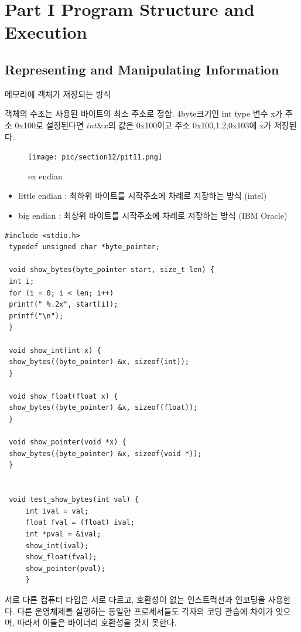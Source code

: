 \documentclass[chapter,oneside]{oblivoir}
\begin{document}
\part{Part I Program Structure and Execution}

\chapter{Representing and Manipulating Information}


메모리에 객체가 저장되는 방식

객체의 수조는 사용된 바이트의 최소 주소로 정함.
4byte크기인 int type 변수 x가 주소 0x100로 설정된다면 $int \&x$의 값은 0x100이고 주소 0x100,1,2,0x103에 x가 저장된다.






\begin{figure}[h!]
    \centering
    \texttt{[image: pic/section12/pit11.png]}
    \caption{ex endian}
\end{figure}


\begin{itemize}
    \item little endian :  최하위 바이트를 시작주소에 차례로 저장하는 방식 (intel)
    \item big endian : 최상위 바이트를 시작주소에 차례로 저장하는 방식 (IBM Oracle)
\end{itemize}


\begin{lstlisting}[style = CStyle]
 #include <stdio.h>
 typedef unsigned char *byte_pointer;

 void show_bytes(byte_pointer start, size_t len) {
 int i;
 for (i = 0; i < len; i++)
 printf(" %.2x", start[i]);
 printf("\n");
 }

 void show_int(int x) {
 show_bytes((byte_pointer) &x, sizeof(int));
 }

 void show_float(float x) {
 show_bytes((byte_pointer) &x, sizeof(float));
 }

 void show_pointer(void *x) {
 show_bytes((byte_pointer) &x, sizeof(void *));
 }


 void test_show_bytes(int val) {
     int ival = val;
     float fval = (float) ival;
     int *pval = &ival;
     show_int(ival);
     show_float(fval);
     show_pointer(pval);
     }

\end{lstlisting}
서로 다른 컴퓨터 타입은 서로 다르고, 호환성이 없는 인스트럭션과 인코딩을 사용한다. 다른 운영체제를 실행하는 동일한 프로세서들도 각자의 코딩 관습에 차이가 잇으며, 따라서 이들은 바이너리 호환성을 갖지 못한다.
\end{document}
